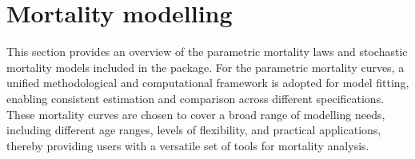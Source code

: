 \section{Mortality modelling}\label{mortality-modelling}

This section provides an overview of the parametric mortality laws and stochastic mortality models included in the  package. For the parametric mortality curves, a unified methodological and computational framework is adopted for model fitting, enabling consistent estimation and comparison across different specifications. These mortality curves are chosen to cover a broad range of modelling needs, including different age ranges, levels of flexibility, and practical applications, thereby providing users with a versatile set of tools for mortality analysis.

